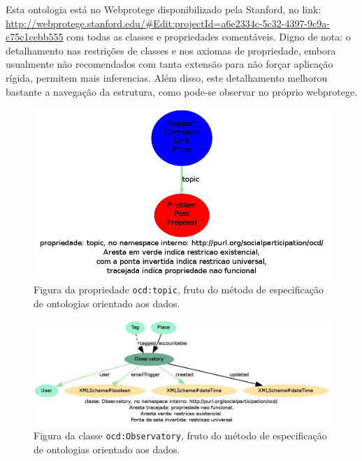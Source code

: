 \documentclass[12pt]{article}
\begin{document}
Esta ontologia está no Webprotege disponibilizado pela Stanford, no link: \url{http://webprotege.stanford.edu/#Edit:projectId=a6e2334c-5c32-4397-9c9a-c75c1cebb555} com todas as classes e propriedades comentáveis. Digno de nota: o detalhamento nas restrições de classes e nos axiomas de propriedade, embora usualmente não recomendados com tanta extensão para não forçar aplicação rígida, permitem mais inferencias. Além disso, este detalhamento melhorou bastante a navegação da estrutura, como pode-se observar no próprio webprotege.

\begin{figure}[h!]
  \centering
    \includegraphics[width=\textwidth]{../figs/topic.png}
  \caption{Figura da propriedade \texttt{ocd:topic}, fruto do método de especificação de ontologias orientado aos dados.}\label{fig:ocdp}
\end{figure}

\begin{figure}[h!]
  \centering
    \includegraphics[width=\textwidth]{../figs/Observatory.png}
  \caption{Figura da classe \texttt{ocd:Observatory}, fruto do método de especificação de ontologias orientado aos dados.}\label{fig:ocdc}
\end{figure}
\end{document}
